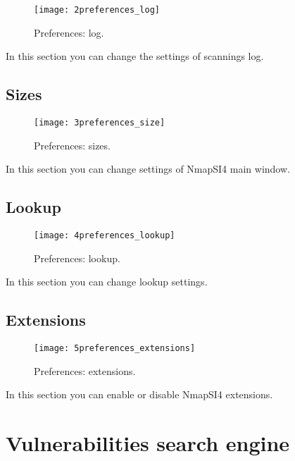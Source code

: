 \begin{figure}[h]
  \centering
  \texttt{[image: 2preferences\_log]}
  \caption{Preferences: log.}
  \label{fig:PreferencesLog}
\end{figure}
In this section you can change the settings of scannings log.

\section{Sizes}
\label{sec:PreferencesDimensions}

\begin{figure}[h]
  \centering
  \texttt{[image: 3preferences\_size]}
  \caption{Preferences: sizes.}
  \label{fig:PreferencesDimensions}
\end{figure}
In this section you can change settings of NmapSI4 main window.

\section{Lookup}
\label{sec:PreferencesLookup}

\begin{figure}[h]
  \centering
  \texttt{[image: 4preferences\_lookup]}
  \caption{Preferences: lookup.}
  \label{fig:PreferencesLookup}
\end{figure}
In this section you can change lookup settings.

\section{Extensions}
\label{sec:PreferencesExtensions}

\begin{figure}[h]
  \centering
  \texttt{[image: 5preferences\_extensions]}
  \caption{Preferences: extensions.}
  \label{fig:PreferencesExtensions}
\end{figure}
In this section you can enable or disable NmapSI4 extensions.

\chapter{Vulnerabilities search engine}
\label{ch:Vulnerability}

